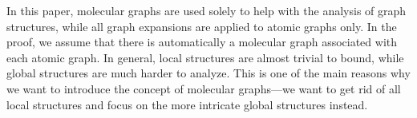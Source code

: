 \documentclass{article}
\newcommand{\1}{\mathds{1}}
\numberwithin{equation}{section}
\newcommand{\dashed}{\text{diffusive}}
\DeclareMathOperator{\OO}{O}
\theoremstyle{plain} %
\theoremstyle{remark}
\newtheorem{remark}[theorem]{Remark}
\newcommand{\cor}{\color{red}}
\newcommand{\nc}{\normalcolor}
\begin{document}


In this paper, molecular graphs are used solely to help with the analysis of graph structures, while all graph expansions are  applied to atomic graphs only. In the proof, we assume that there is automatically a molecular graph associated with each atomic graph. In general, local structures are almost trivial to bound, while global structures are much harder to analyze. This is one of the main reasons why we want to introduce the concept of molecular graphs---we want to get rid of all local structures and focus on the more intricate global structures instead.



\end{document}
